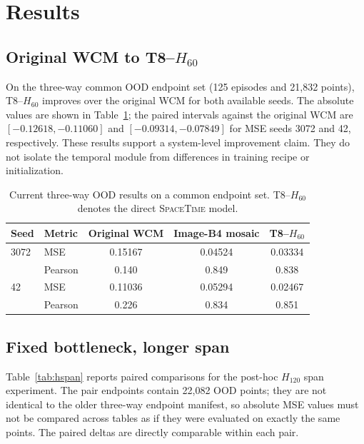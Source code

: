 \documentclass[10pt,a4paper]{article}
\newcommand{\SpaceTime}{\textsc{SpaceTime}}
\begin{document}
\section{Results}

\subsection{Original WCM to T8--$H_{60}$}

On the three-way common OOD endpoint set (125 episodes and 21,832 points), T8--$H_{60}$ improves over the original WCM for both available seeds. The absolute values are shown in Table~\ref{tab:threeway}; the paired intervals against the original WCM are $[-0.12618,-0.11060]$ and $[-0.09314,-0.07849]$ for MSE seeds 3072 and 42, respectively. These results support a system-level improvement claim. They do not isolate the temporal module from differences in training recipe or initialization.

\begin{table}[t]
\centering
\caption{Current three-way OOD results on a common endpoint set. T8--$H_{60}$ denotes the direct \SpaceTime{} model.}
\label{tab:threeway}
\small
\begin{tabular}{llccc}
\toprule
Seed & Metric & Original WCM & Image-B4 mosaic & T8--$H_{60}$ \\
\midrule
3072 & MSE & 0.15167 & 0.04524 & 0.03334 \\
     & Pearson & 0.140 & 0.849 & 0.838 \\
42   & MSE & 0.11036 & 0.05294 & 0.02467 \\
     & Pearson & 0.226 & 0.834 & 0.851 \\
\bottomrule
\end{tabular}
\end{table}

\subsection{Fixed bottleneck, longer span}

Table~\ref{tab:hspan} reports paired comparisons for the post-hoc $H_{120}$ span experiment. The pair endpoints contain 22,082 OOD points; they are not identical to the older three-way endpoint manifest, so absolute MSE values must not be compared across tables as if they were evaluated on exactly the same points. The paired deltas are directly comparable within each pair.
\end{document}
